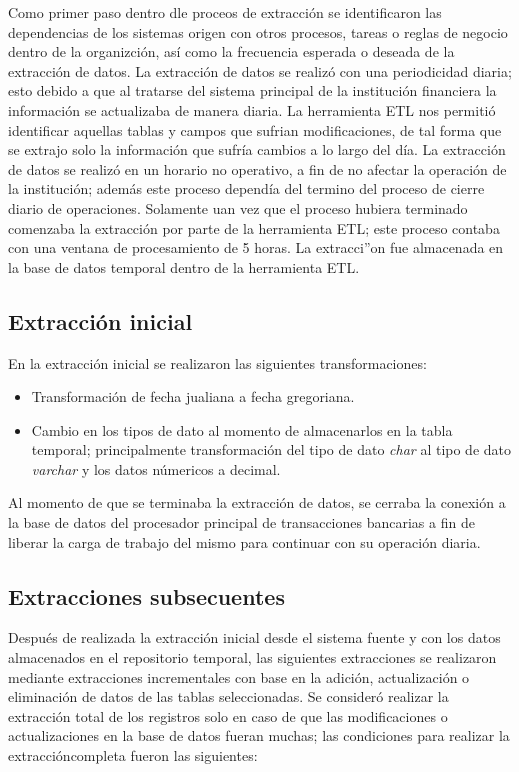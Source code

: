 \documentclass[a4paper,openright,12pt]{book}
\begin{document}
Como primer paso dentro dle proceos de extracción se identificaron las
dependencias de los sistemas origen con otros procesos, tareas o reglas de
negocio dentro de la organizción, así como la frecuencia esperada o deseada de
la extracción de datos. La extracción de datos se realizó con una periodicidad
diaria; esto debido a que al tratarse del sistema principal de la institución
financiera la información se actualizaba de manera diaria. La herramienta ETL
nos permitió identificar aquellas tablas y campos que sufrian modificaciones, de
tal forma que se extrajo solo la información que sufría cambios a lo largo del
día. La extracción de datos se realizó en un horario no operativo, a fin de no
afectar la operación de la institución; además este proceso dependía del termino
del proceso de cierre diario de operaciones. Solamente uan vez que el proceso
hubiera terminado comenzaba la extracción por parte de la herramienta ETL; este
proceso contaba con una ventana de procesamiento de 5 horas. La extracci''on fue
almacenada en la base de datos temporal dentro de la herramienta ETL.

\subsection{Extracción inicial}

En la extracción inicial se realizaron las siguientes transformaciones:

\begin{itemize}
\item Transformación de fecha jualiana a fecha gregoriana.
\item Cambio en los tipos de dato al momento de almacenarlos en la tabla
  temporal; principalmente transformación del tipo de dato \textit{char} al tipo
  de dato \textit{varchar} y los datos númericos a decimal.
\end{itemize}

Al momento de que se terminaba la extracción de datos, se cerraba la conexión a
la base de datos del procesador principal de transacciones bancarias a fin de
liberar la carga de trabajo del mismo para continuar con su operación diaria.

\subsection{Extracciones subsecuentes}

Después de realizada la extracción inicial desde el sistema fuente y con los
datos almacenados en el repositorio temporal, las siguientes extracciones se
realizaron mediante extracciones incrementales con base en la adición,
actualización o eliminación de datos de las tablas seleccionadas. Se consideró
realizar la extracción total de los registros solo en caso de que las
modificaciones o actualizaciones en la base de datos fueran muchas; las
condiciones para realizar la extraccióncompleta fueron las siguientes:
\end{document}
